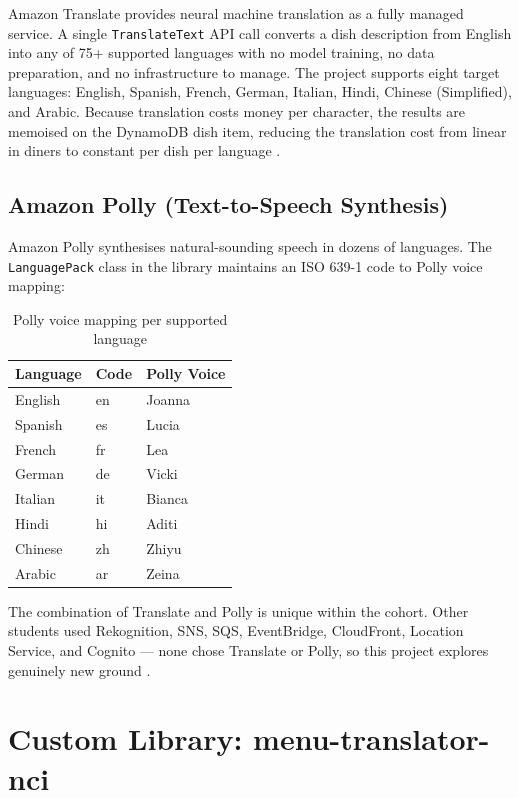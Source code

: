 \documentclass[conference]{IEEEtran}
\begin{document}
Amazon Translate provides neural machine translation as a fully managed service. A single \texttt{TranslateText} API call converts a dish description from English into any of 75+ supported languages with no model training, no data preparation, and no infrastructure to manage. The project supports eight target languages: English, Spanish, French, German, Italian, Hindi, Chinese (Simplified), and Arabic. Because translation costs money per character, the results are memoised on the DynamoDB dish item, reducing the translation cost from linear in diners to constant per dish per language \cite{translatedocs}.

\subsection{Amazon Polly (Text-to-Speech Synthesis)}

Amazon Polly synthesises natural-sounding speech in dozens of languages. The \texttt{LanguagePack} class in the library maintains an ISO 639-1 code to Polly voice mapping:

\begin{table}[H]
\centering
\caption{Polly voice mapping per supported language}
\begin{tabular}{lll}
\toprule
\textbf{Language} & \textbf{Code} & \textbf{Polly Voice} \\
\midrule
English   & en & Joanna \\
Spanish   & es & Lucia  \\
French    & fr & Lea    \\
German    & de & Vicki  \\
Italian   & it & Bianca \\
Hindi     & hi & Aditi  \\
Chinese   & zh & Zhiyu  \\
Arabic    & ar & Zeina  \\
\bottomrule
\end{tabular}
\end{table}

The combination of Translate and Polly is unique within the cohort. Other students used Rekognition, SNS, SQS, EventBridge, CloudFront, Location Service, and Cognito --- none chose Translate or Polly, so this project explores genuinely new ground \cite{pollydocs}.

\section{Custom Library: menu-translator-nci}
\end{document}
